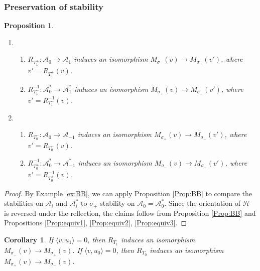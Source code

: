 \documentclass[leqno,11pt]{amsart}
\newtheorem{Prop}[Thm]{Proposition}
\newtheorem{Cor}[Thm]{Corollary}
\theoremstyle{definition}
\def\AA{\ensuremath{\mathcal A}}
\def\HH{\ensuremath{\mathcal H}}
\begin{document}
\subsubsection{Preservation of stability}

\begin{Prop}\label{Prop:isom-pm}
\begin{enumerate}
\item[(1)]
\begin{enumerate}
\item
$R_{T_1^+}:\AA_0 \to \AA_1$ induces an isomorphism
$M_{\sigma_-}(v) \to M_{\sigma_+}(v')$, where  $v'=R_{T_1^+}(v)$.
\item
$R_{T_1^-}^{-1}:\AA_0^* \to \AA_1^*$ induces an isomorphism
$M_{\sigma_+}(v) \to M_{\sigma_-}(v')$, where  $v'=R_{T_1^-}^{-1}(v)$.
\end{enumerate}
\item[(2)]
\begin{enumerate}
\item
$R_{T_0^-}:\AA_0 \to \AA_{-1}$ induces an isomorphism
$M_{\sigma_+}(v) \to M_{\sigma_-}(v')$, where  $v'=R_{T_0^-}(v)$.
\item
$R_{T_0^+}^{-1}:\AA_0^* \to \AA_{-1}^*$ induces an isomorphism
$M_{\sigma_-}(v) \to M_{\sigma_+}(v')$, where  $v'=R_{T_0^+}^{-1}(v)$.
\end{enumerate}
\end{enumerate}
\end{Prop}

\begin{proof}
By Example \ref{ex:BB}, we can apply Proposition \ref{Prop:BB}
to compare the stabilities on $\AA_i$ and $\AA_i^*$ to 
$\sigma_\pm$-stability on $\AA_0=\AA_0^*$.
Since the orientation of $\HH$ is reversed under the reflection,
the claims follow from Proposition \ref{Prop:BB} and 
Propositions \ref{Prop:equiv1},
\ref{Prop:equiv2}, \ref{Prop:equiv3}.
\end{proof}


\begin{Cor}
If $\langle v,u_1 \rangle=0$,
then $R_{T_1}$ induces an isomorphism
$M_{\sigma_-}(v) \to M_{\sigma_+}(v)$. 
If $\langle v,u_0 \rangle=0$,
then $R_{T_0}$ induces an isomorphism
$M_{\sigma_+}(v)\to M_{\sigma_-}(v)$. 
\end{Cor}
\end{document}
